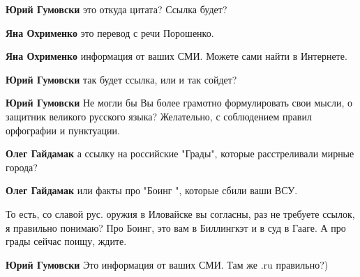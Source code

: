 \begin{itemize}
\begin{itemize}
\textbf{Юрий Гумовски} это откуда цитата? Ссылка будет?


\textbf{Яна Охрименко} это перевод с речи Порошенко.


\textbf{Яна Охрименко} информация от ваших СМИ. Можете сами найти в Интернете.


\textbf{Юрий Гумовски} так будет ссылка, или и так сойдет?


\textbf{Юрий Гумовски} Не могли бы Вы более грамотно формулировать свои мысли,
о защитник великого русского языка? Желательно, с соблюдением правил орфографии
и пунктуации.


\textbf{Олег Гайдамак} а ссылку на российские "Грады", которые расстреливали мирные города?


\textbf{Олег Гайдамак} или факты про "Боинг ", которые сбили ваши ВСУ.


То есть, со славой рус. оружия в Иловайске вы согласны, раз не требуете ссылок,
я правильно понимаю? Про Боинг, это вам в Биллингкэт и в суд в Гааге. А про
грады сейчас поищу, ждите.



\textbf{Юрий Гумовски} Это информация от ваших СМИ. Там же .ru правильно?)


\end{itemize}
\end{itemize}
